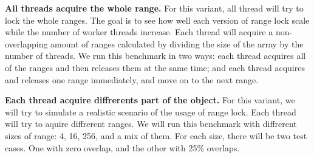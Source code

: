 \begin{enumarate}
    \item \textbf{All threads acquire the whole range.} For this variant, all thread will try to lock the whole ranges. The goal is to see how well each version of range lock scale while the number of worker threads increase. Each thread will acquire a non-overlapping amount of ranges calculated by dividing the size of the array by the number of threads. We run this benchmark in two ways: each thread acquires all of the ranges and then releases them at the same time; and each thread acquires and releases one range immediately, and move on to the next range.

    \item \textbf{Each thread acquire diffrerents part of the object.} For this variant, we will try to simulate a realistic scenario of the usage of range lock. Each thread will try to aquire diffrerent ranges. We will run this benchmark with diffrerent sizes of range: 4, 16, 256, and a mix of them. For each size, there will be two test cases. One with zero overlap, and the other with 25\% overlaps.
\end{enumarate}

